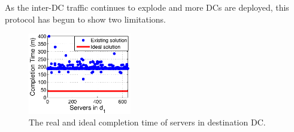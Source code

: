 
As the inter-DC traffic continues to explode and more DCs are
deployed, this protocol has begun to show two limitations.

\begin{figure}[t]
  \centering
  \includegraphics[width=45mm]{images/SEvsIdeal.eps}
  \caption{The real and ideal completion time of servers in destination DC.}
  \label{fig:motivation}
\vspace{-0.4cm}
\end{figure}


